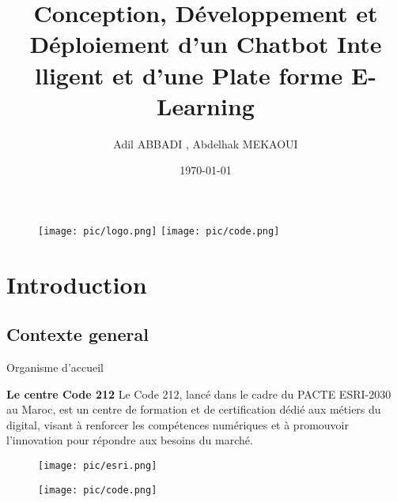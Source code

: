 \documentclass{beamer}
\author{Adil ABBADI , Abdelhak MEKAOUI}
\title{Conception, Développement et Déploiement d'un Chatbot Inte lligent et d'une Plate forme E-Learning}
\institute{ENSA Agadir}
\date{\today}
\begin{document}



\begin{frame}

    \begin{figure}[htpb]
        \begin{center}
            \texttt{[image: pic/logo.png]}
            \hspace{0.05\linewidth}
            \texttt{[image: pic/code.png]}
        \end{center}
    \end{figure}

    \titlepage

\end{frame}


\begin{frame}
    \tableofcontents[sectionstyle=show,subsectionstyle=show/shaded/hide,subsubsectionstyle=show/shaded/hide]
\end{frame}

\section{Introduction}

\subsection{Contexte general}


\begin{frame}{Organisme d'accueil}

    \vspace{0.5cm} %
    \begin{block}{\centering \textbf{\Large Le centre Code 212}}
        \centering
        \vspace{0.2cm} %
        Le Code 212, lancé dans le cadre du PACTE ESRI-2030 au Maroc, est un centre de formation et de certification dédié aux métiers du digital, visant à renforcer les compétences numériques et à promouvoir l’innovation pour répondre aux besoins du marché.
    \end{block}

    \begin{figure}[htpb]
        \centering
        \begin{minipage}[b]{0.45\linewidth}
            \centering
            \texttt{[image: pic/esri.png]}
        \end{minipage}
        \begin{minipage}[b]{0.45\linewidth}
            \centering
            \texttt{[image: pic/code.png]}
        \end{minipage}
    \end{figure}
\end{frame}
\end{document}
